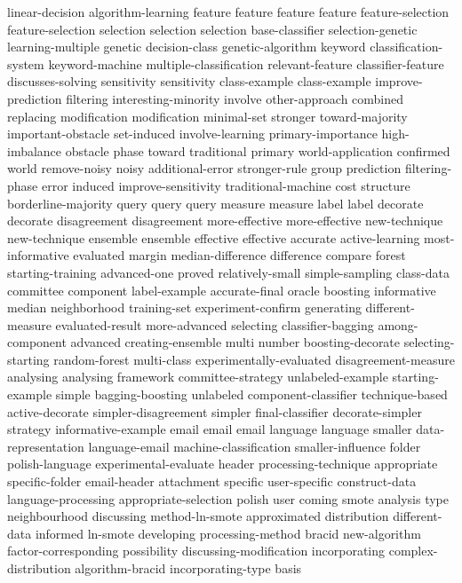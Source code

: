linear-decision	
algorithm-learning	
feature	feature	feature	feature	
feature-selection	feature-selection	
selection	selection	selection	
base-classifier	
selection-genetic	
learning-multiple	
genetic	
decision-class	
genetic-algorithm	
keyword	
classification-system	
keyword-machine	
multiple-classification	
relevant-feature	
classifier-feature	
discusses-solving	
sensitivity	sensitivity	
class-example	class-example	
improve-prediction	
filtering	
interesting-minority	
involve	
other-approach	
combined	
replacing	
modification	modification	
minimal-set	
stronger	
toward-majority	
important-obstacle	
set-induced	
involve-learning	
primary-importance	
high-imbalance	
obstacle	
phase	
toward	
traditional	
primary	
world-application	
confirmed	
world	
remove-noisy	
noisy	
additional-error	
stronger-rule	
group	
prediction	
filtering-phase	
error	
induced	
improve-sensitivity	
traditional-machine	
cost	
structure	
borderline-majority	
query	query	query	
measure	measure	
label	label	
decorate	decorate	
disagreement	disagreement	
more-effective	more-effective	
new-technique	new-technique	
ensemble	ensemble	
effective	effective	
accurate	
active-learning	
most-informative	
evaluated	
margin	
median-difference	
difference	
compare	
forest	
starting-training	
advanced-one	
proved	
relatively-small	
simple-sampling	
class-data	
committee	
component	
label-example	
accurate-final	
oracle	
boosting	
informative	
median	
neighborhood	
training-set	
experiment-confirm	
generating	
different-measure	
evaluated-result	
more-advanced	
selecting	
classifier-bagging	
among-component	
advanced	
creating-ensemble	
multi	
number	
boosting-decorate	
selecting-starting	
random-forest	
multi-class	
experimentally-evaluated	
disagreement-measure	
analysing	analysing	
framework	
committee-strategy	
unlabeled-example	
starting-example	
simple	
bagging-boosting	
unlabeled	
component-classifier	
technique-based	
active-decorate	
simpler-disagreement	
simpler	
final-classifier	
decorate-simpler	
strategy	
informative-example	
email	email	email	
language	language	
smaller	
data-representation	
language-email	
machine-classification	
smaller-influence	
folder	
polish-language	
experimental-evaluate	
header	
processing-technique	
appropriate	
specific-folder	
email-header	
attachment	
specific	
user-specific	
construct-data	
language-processing	
appropriate-selection	
polish	
user	
coming	
smote	
analysis	
type	
neighbourhood	
discussing	
method-ln-smote	
approximated	
distribution	
different-data	
informed	
ln-smote	
developing	
processing-method	
bracid	
new-algorithm	
factor-corresponding	
possibility	
discussing-modification	
incorporating	
complex-distribution	
algorithm-bracid	
incorporating-type	
basis	
